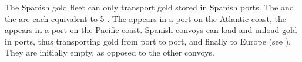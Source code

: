 \label{chIncomes:SpanishConvoys} The Spanish gold
fleet can only transport gold stored in Spanish ports. The  and the  are each equivalent to 5 \NTD.
\bparag The  appears in a port on the Atlantic coast, the
 appears in a port on the Pacific coast.
\bparag Spanish convoys can load and unload gold in ports, thus transporting
gold from port to port, and finally to Europe (see
). They are initially empty, as opposed
to the other convoys.








%

